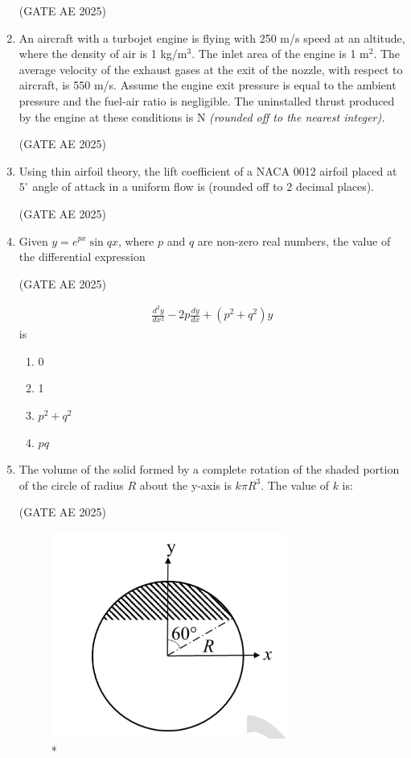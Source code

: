 \documentclass[journal,12pt,onecolumn]{IEEEtran}
\theoremstyle{remark}
\begin{document}
\begin{flushleft}
\begin{enumerate}
\hfill (GATE AE 2025)

\item An aircraft with a turbojet engine is flying with 250 m/s speed at an altitude, where the density of air is 1 kg/m$^3$. The inlet area of the engine is 1 m$^2$. The average velocity of the exhaust gases at the exit of the nozzle, with respect to aircraft, is 550 m/s. Assume the engine exit pressure is equal to the ambient pressure and the fuel-air ratio is negligible. The uninstalled thrust produced by the engine at these conditions is \underline{\hspace{3cm}} N \textit{(rounded off to the nearest integer).}

\hfill (GATE AE 2025)

\item Using thin airfoil theory, the lift coefficient of a NACA 0012 airfoil placed at $5^\circ$ angle of attack in a uniform flow is \underline{\hspace{3cm}} (rounded off to 2 decimal places).

\hfill (GATE AE 2025)

\item  Given $y = e^{px} \sin qx$, where $p$ and $q$ are non-zero real numbers, the value of the differential expression

\hfill (GATE AE 2025)

\begin{align*}
\frac{d^2y}{dx^2} - 2p \frac{dy}{dx} + (p^2 + q^2)y
\end{align*}
is
\begin{enumerate}
    \item 0
    \item 1
    \item $p^2 + q^2$
    \item $pq$
\end{enumerate}

\item  The volume of the solid formed by a complete rotation of the shaded portion of the circle of radius $R$ about the y-axis is $k \pi R^3$. The value of $k$ is:

\hfill (GATE AE 2025)

\begin{figure}[H]
\includegraphics[width=0.35\columnwidth]{figs/37.png}
\caption{*}
    \label{fig:placeholder}
\end{figure}


\end{enumerate}
\end{flushleft}
\end{document}
